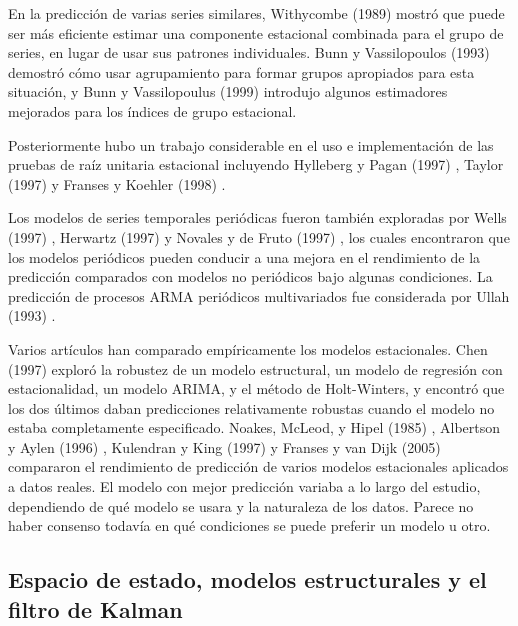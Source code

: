 \documentclass{llncs}
\begin{document}
En la predicción de varias series similares, Withycombe (1989) \cite{Withycombe1989547} mostró que puede ser más eficiente estimar una componente estacional combinada para el grupo de series, en lugar de usar sus patrones individuales. Bunn y Vassilopoulos (1993) \cite{Bunn1993517} demostró cómo usar agrupamiento para formar grupos apropiados para esta situación, y Bunn y Vassilopoulus (1999)\cite{Bunn1999431} introdujo algunos estimadores mejorados para los índices de grupo estacional.

Posteriormente hubo un trabajo considerable en el uso e implementación de las pruebas de raíz unitaria estacional incluyendo Hylleberg y Pagan (1997) \cite{Hylleberg1997329}, Taylor (1997)\cite{Taylor1997307} y Franses y Koehler (1998) \cite{Franses1998405}. 

Los modelos de series temporales periódicas fueron también exploradas por Wells (1997) \cite{Wells1997407}, Herwartz (1997) \cite{Herwartz1997421} y Novales y de Fruto (1997) \cite{Novales1997393}, los cuales encontraron que los modelos periódicos pueden conducir a una mejora en el rendimiento de la predicción comparados con modelos no periódicos bajo algunas condiciones. La predicción de procesos ARMA periódicos multivariados fue considerada por Ullah (1993) \cite{Ula1993645}.

Varios artículos han comparado empíricamente los modelos estacionales. Chen (1997) \cite{Chen1997269} exploró la robustez de un modelo estructural, un modelo de regresión con estacionalidad, un modelo ARIMA, y el método de Holt-Winters, y encontró que los dos últimos daban predicciones relativamente robustas cuando el modelo no estaba completamente especificado. Noakes, McLeod, y Hipel (1985) \cite{Noakes1985179}, Albertson y Aylen (1996) \cite{Albertson1996345}, Kulendran y King (1997) \cite{Kulendran1997319} y Franses y van Dijk (2005) \cite{Franses200587} compararon el rendimiento de predicción de varios modelos estacionales aplicados a datos reales. El modelo con mejor predicción variaba a lo largo del estudio, dependiendo de qué modelo se usara y la naturaleza de los datos. Parece no haber consenso todavía en qué condiciones se puede preferir un modelo u otro.

\subsection{Espacio de estado, modelos estructurales y el filtro de Kalman}
\end{document}
